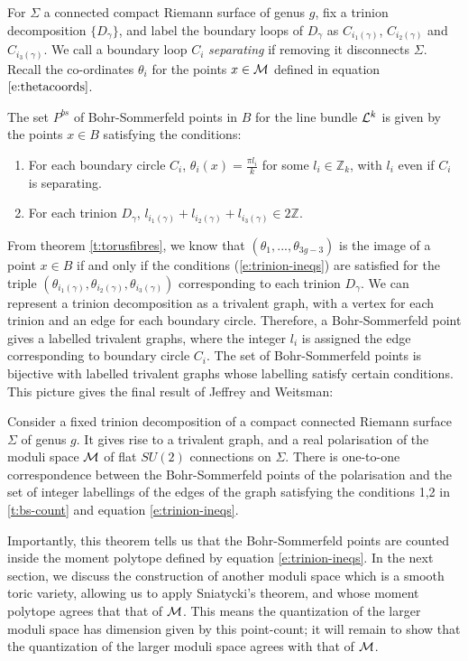	For $\Sigma$ a connected compact Riemann surface of genus $g$, fix a trinion decomposition $\{D_\gamma\}$, and label the boundary loops of $D_\gamma$ as $C_{i_1(\gamma)}$, $C_{i_2(\gamma)}$ and $C_{i_3(\gamma)}$. We call a boundary loop $C_i$ \emph{separating} if removing it disconnects $\Sigma$. Recall the co-ordinates $\theta_i$ for the points $x\in \mathcal{M}$ defined in equation $\ref{e:thetacoords}$. 
	\begin{theorem}[J\&W Thm 8.1]
		\label{t:bs-count}
		The set $P^{bs}$ of Bohr-Sommerfeld points in $B$ for the line bundle $\mathcal{L}^k$ is given by the points $x\in B$ satisfying the conditions:
		\begin{enumerate}
			\item For each boundary circle $C_i$, $\theta_i(x) = \frac{\pi l_i}{k}$ for some $l_i \in \mathbb{Z}_k$, with $l_i$ even if $C_i$ is separating.
			\item For each trinion $D_\gamma$, $l_{i_1(\gamma)} + l_{i_2(\gamma)} + l_{i_3(\gamma)} \in 2\mathbb{Z}$.
		\end{enumerate}
	\end{theorem}
	From theorem \ref{t:torusfibres}, we know that $(\theta_1,...,\theta_{3g-3})$ is the image of a point $x\in B$ if and only if the conditions (\ref{e:trinion-ineqs}) are satisfied for the triple $(\theta_{i_1(\gamma)}, \theta_{i_2(\gamma)}, \theta_{i_3(\gamma)})$ corresponding to each trinion $D_\gamma$. We can represent a trinion decomposition as a trivalent graph, with a vertex for each trinion and an edge for each boundary circle. Therefore, a Bohr-Sommerfeld point gives a labelled trivalent graphs, where the integer $l_i$ is assigned the edge corresponding to boundary circle $C_i$. The set of Bohr-Sommerfeld points is bijective with labelled trivalent graphs whose labelling satisfy certain conditions. This picture gives the final result of Jeffrey and Weitsman:
	\begin{theorem}[J\& W Thm 8.3]
		Consider a fixed trinion decomposition of a compact connected Riemann surface $\Sigma$ of genus $g$. It gives rise to a trivalent graph, and a real polarisation of the moduli space $\mathcal{M}$ of flat $SU(2)$ connections on $\Sigma$. There is one-to-one correspondence between the Bohr-Sommerfeld points of the polarisation and the set of integer labellings of the edges of the graph satisfying the conditions 1,2 in \ref{t:bs-count} and equation \ref{e:trinion-ineqs}.
	\end{theorem}
	Importantly, this theorem tells us that the Bohr-Sommerfeld points are counted inside the moment polytope defined by equation \ref{e:trinion-ineqs}. In the next section, we discuss the construction of another moduli space which is a smooth toric variety, allowing us to apply Sniatycki's theorem, and whose moment polytope agrees that that of $\mathcal{M}$. This means the quantization of the larger moduli space has dimension given by this point-count; it will remain to show that the quantization of the larger moduli space agrees with that of $\mathcal{M}$. 
	
	